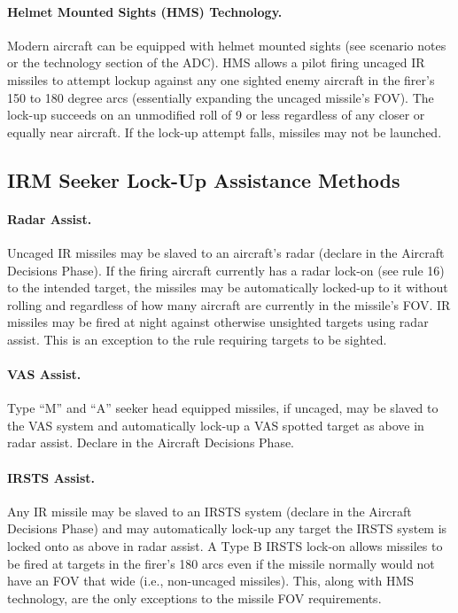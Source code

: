 \paragraph{Helmet Mounted Sights (HMS) Technology.} Modern aircraft can be equipped with helmet mounted sights (see scenario notes or the technology section of the ADC). HMS allows a pilot firing uncaged IR missiles to attempt lock­up against any one sighted enemy aircraft in the firer's 150 to 180 degree arcs (essentially expanding the uncaged missile's FOV). The lock-up succeeds on an unmodified roll of 9 or less regardless of any closer or equally near aircraft. If the lock-up attempt falls, missiles may not be launched.

\subsection{IRM Seeker Lock-Up Assistance Methods}

\paragraph{Radar Assist.} Uncaged IR missiles may be slaved to an aircraft's radar (declare in the Aircraft Decisions Phase). If the firing aircraft currently has a radar lock-on (see rule 16) to the intended target, the missiles may be automatically locked-up to it without rolling and regardless of how many aircraft are currently in the missile's FOV. IR missiles may be fired at night against otherwise unsighted targets using radar assist. This is an exception to the rule requiring targets to be sighted.

\paragraph{VAS Assist.} Type “M” and “A” seeker head equipped missiles, if uncaged, may be slaved to the VAS system and automatically lock-up a VAS spotted target as above in radar assist. Declare in the Aircraft Decisions Phase.

\paragraph{IRSTS Assist.} Any IR missile may be slaved to an IRSTS system (declare in the Aircraft Decisions Phase) and may automatically lock-up any target the IRSTS system is locked onto as above in radar assist. A Type B IRSTS lock-on allows missiles to be fired at targets in the firer's 180 arcs even if the missile normally would not have an FOV that wide (i.e., non-uncaged missiles). This, along with HMS technology, are the only exceptions to the missile FOV requirements.

